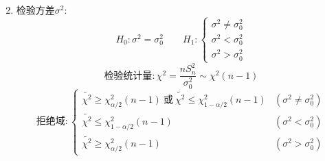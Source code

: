 \begin{enumerate}
\begin{displaymath}
  \end{displaymath}
  \item
  检验方差$\sigma^2$:
  \begin{displaymath}
    H_0:\sigma^2=\sigma_0^2 \qquad
    H_1: \begin{cases}
      \sigma^2\neq\sigma_0^2 \\
      \sigma^2 < \sigma_0^2 \\
      \sigma^2 > \sigma_0^2
    \end{cases}
  \end{displaymath}
  \begin{displaymath}
    \text{检验统计量}: \chi^2=\frac{nS_n^2}{\sigma_0^2}\sim \chi^2(n-1)
  \end{displaymath}
  \begin{displaymath}
    \text{拒绝域}: \begin{cases}
      \widetilde{\chi^2} \ge \chi^2_{\alpha/2}(n-1)
        \ \text{或}\ \widetilde{\chi^2} \le \chi^2_{1-\alpha/2}(n-1)
        & (\sigma^2\neq\sigma_0^2) \\
      \widetilde{\chi^2} \le \chi^2_{1-\alpha/2}(n-1)
        & (\sigma^2 < \sigma_0^2) \\
      \widetilde{\chi^2} \ge \chi^2_{\alpha/2}(n-1)
        & (\sigma^2 > \sigma_0^2)
    \end{cases}
  \end{displaymath}
\end{enumerate}


